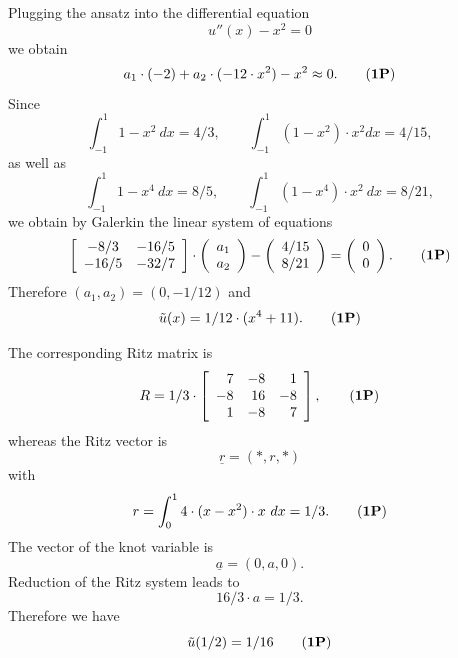 \begin{loesung}
\begin{teilaufgaben}
\item
Plugging the ansatz into the differential equation
\[
u''(x) - x^2 = 0
\]
we obtain
\begin{equation}
a_1 \cdot (-2) + a_2 \cdot (-12 \cdot x^2) - x^2 \approx 0.
\tag{{\bf 1P}}
\end{equation}
Since
\[
\int_{-1}^1 1 - x^2 \ dx = 4/3,
\qquad
\int_{-1}^1 (1-x^2) \cdot x^2 dx = 4/15,
\]
as well as
\[
\int_{-1}^1 1 - x^4 \ dx = 8/5,
\qquad
\int_{-1}^1 (1 - x^4) \cdot x^2 \ dx = 8/21,
\]
we obtain by Galerkin the linear system of equations
\begin{equation}
\left[\begin{array}{cc}
  -8/3 & -16/5 \\
 -16/5 & -32/7
\end{array}\right]
\cdot
\left(\begin{array}{r} a_1 \\ a_2 \end{array}\right)
-
\left(\begin{array}{c} 4/15 \\ 8/21 \end{array}\right)
=
\left(\begin{array}{r} 0 \\ 0 \end{array}\right).
\tag{{\bf 1P}}
\end{equation}
Therefore $(a_1, a_2) = (0, -1/12)$ and
\begin{equation}
\tilde u(x) =  1/12 \cdot (x^4 + 11).
\tag{{\bf 1P}}
\end{equation}
\item
The corresponding Ritz matrix is
\begin{equation}
R = 1/3 \cdot
\left[\begin{array}{rrr}
 7 & -8 &  1 \\
-8 & 16 & -8 \\
 1 & -8 &  7
\end{array}\right],
\tag{{\bf 1P}}
\end{equation}
whereas the Ritz vector is
\[
\underline{r} = (*,r,*)
\]
with
\begin{equation}
r = \int_0^1 4 \cdot (x - x^2) \cdot x \ dx = 1/3.
\tag{{\bf 1P}}
\end{equation}
The vector of the knot variable is
\[
\underline{a} = (0, a, 0).
\]
Reduction of the Ritz system leads to  
\[
16/3 \cdot a = 1/3.
\]
Therefore we have
\begin{equation}
\tilde u(1/2) = 1/16
\tag{{\bf 1P}}
\end{equation}
\end{teilaufgaben}
\end{loesung}
